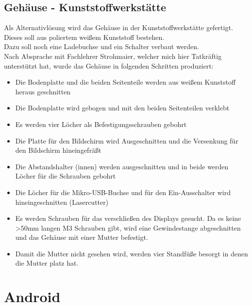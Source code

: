 \documentclass[12pt,a4paper]{article}
\begin{document}
{\newpage
\subsection{Gehäuse - Kunststoffwerkstätte}

Als Alternativlösung wird das Gehäuse in der Kunststoffwerkstätte gefertigt. Dieses soll aus poliertem weißem Kunststoff bestehen. \\
Dazu soll noch eine Ladebuchse und ein Schalter verbaut werden. \\
Nach Absprache mit Fachlehrer Strohmaier, welcher mich hier Tatkräftig unterstützt hat, wurde das Gehäuse in folgenden Schritten produziert:
\begin{itemize}
	\item{Die Bodenplatte und die beiden Seitenteile werden aus weißem Kunststoff heraus geschnitten}
	\item{Die Bodenplatte wird gebogen und mit den beiden Seitenteilen verklebt}
	\item{Es werden vier Löcher als Befestigungsschrauben gebohrt}
	\item{Die Platte für den Bildschirm wird Ausgeschnitten und die Versenkung für den Bildschirm hineingefräßt}
	\item{Die Abstandshalter (innen) werden ausgeschnitten und in beide werden Löcher für die Schrauben gebohrt}
	\item{Die Löcher für die Mikro-USB-Buchse und für den Ein-Ausschalter wird hineingeschnitten (Lasercutter)}
	\item{Es werden Schrauben für das verschließen des Displays gesucht. Da es keine >50mm langen M3 Schrauben gibt, wird eine Gewindestange abgeschnitten und das Gehäuse mit einer Mutter befestigt.}
	\item{Damit die Mutter nicht gesehen wird, werden vier Standfüße besorgt in denen die Mutter platz hat.}
\end{itemize}


\clearpage\vfill\newpage{}
\section{Android}
\label{SEC:android}


\clearpage\vfill\newpage{}
}
\end{document}
